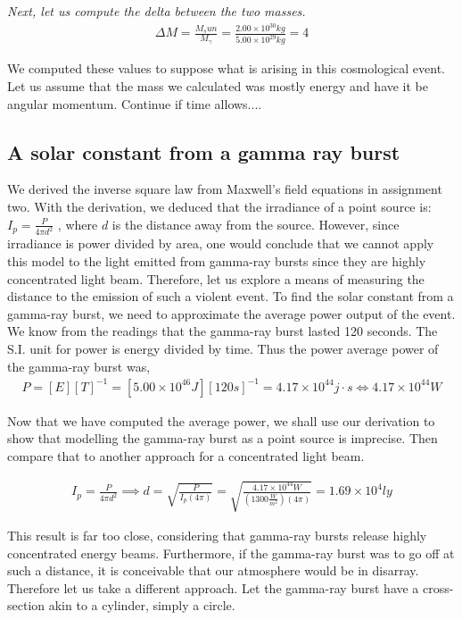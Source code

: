 \documentclass{article}
\begin{document}
\textit{Next, let us compute the delta between the two masses.}
\begin{gather*}
	\Delta M = \frac{M_sun}{M_\gamma} = \frac{2.00\times10^{30}kg}{5.00\times10^{29}kg} = 4
\end{gather*}

We computed these values to suppose what is arising in this cosmological event. Let us assume that the mass we calculated was mostly energy and have it be angular momentum. Continue if time allows....
\subsection{A solar constant from a gamma ray burst}

We derived the inverse square law from Maxwell's field equations in assignment two. With the derivation, we deduced that the irradiance of a point source is:  $ I_p = \frac{P}{4\pi d^2}$ , where $d$ is the distance away from the source. However, since irradiance is power divided by area, one would conclude that we cannot apply this model to the light emitted from gamma-ray bursts since they are highly concentrated light beam. Therefore, let us explore a means of measuring the distance to the emission of such a violent event. To find the solar constant from a gamma-ray burst, we need to approximate the average power output of the event. We know from the readings that the gamma-ray burst lasted 120 seconds. The S.I. unit for power is energy divided by time. Thus the power average power of the gamma-ray burst was,
\begin{gather*}
P = [E][T]^{-1} = [5.00\times10^{46}J][120s]^{-1} = 4.17\times10^{44} j\cdot s \iff 4.17\times10^{44} W
\end{gather*}

Now that we have computed the average power, we shall use our derivation to show that modelling the gamma-ray burst as a point source is imprecise. Then compare that to another approach for a concentrated light beam.

\begin{gather*}
I_p = \frac{P}{4\pi d^2} \implies d = \sqrt{\frac{P}{I_p(4\pi)}} = \sqrt{\frac{4.17\times10^{44}W}{(1300\frac{W}{m^2})(4\pi)}} = 1.69\times10^4 ly
\end{gather*}

This result is far too close, considering that gamma-ray bursts release highly concentrated energy beams. Furthermore, if the gamma-ray burst was to go off at such a distance, it is conceivable that our atmosphere would be in disarray. Therefore let us take a different approach. Let the gamma-ray burst have a cross-section akin to a cylinder, simply a circle.  
\end{document}
